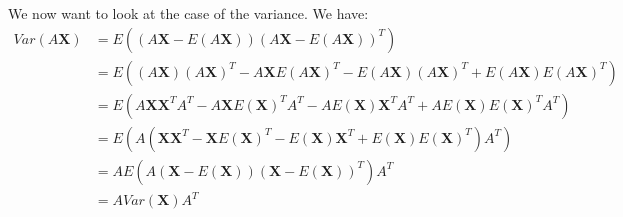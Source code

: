\documentclass{article}
\begin{document}
We now want to look at the case of the variance. We have:
\begin{align*}
    Var(A \mathbf{X}) & = E((A \mathbf{X} - E(A \mathbf{X})) (A \mathbf{X} - E(A \mathbf{X}))^T)                                                                       \\
                      & = E((A \mathbf{X})(A \mathbf{X})^T  - A \mathbf{X} E(A \mathbf{X})^T - E(A \mathbf{X}) (A \mathbf{X})^T + E(A \mathbf{X}) E(A \mathbf{X})^T)   \\
                      & = E(A \mathbf{X}\mathbf{X}^T A^T  - A \mathbf{X} E(\mathbf{X})^T A^T - A E(\mathbf{X}) \mathbf{X}^T A^T + A E(\mathbf{X}) E(\mathbf{X})^T A^T) \\
                      & = E(A (\mathbf{X}\mathbf{X}^T  - \mathbf{X} E(\mathbf{X})^T - E(\mathbf{X}) \mathbf{X}^T + E(\mathbf{X}) E(\mathbf{X})^T ) A^T)                \\
                      & = A E(A (\mathbf{X} - E(\mathbf{X})) (\mathbf{X} - E(\mathbf{X}))^T) A^T                                                                       \\
                      & = A Var(\mathbf{X}) A^T                                                                                                                        \\
\end{align*}



\end{document}
